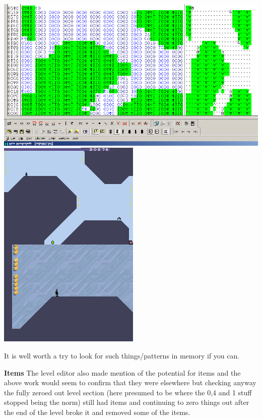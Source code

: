 \documentclass[
]{book}
\begin{document}
\includegraphics{images/175_home_fast6191_romhackingguide_unrenamed_fil___ers_romhackingguideleveleditingworkedNplus8.png}\includegraphics{images/169_home_fast6191_romhackingguide_unrenamed_fil___ers_romhackingguideleveleditingworkedNplus2.png}

It is well worth a try to look for such things/patterns in memory if you can.

\textbf{Items} The level editor also made mention of the potential for items and the above work would seem to confirm that they were elsewhere but checking anyway the fully zeroed out level section (here presumed to be where the 0,4 and 1 stuff stopped being the norm) still had items and continuing to zero things out after the end of the level broke it and removed some of the items.
\end{document}
